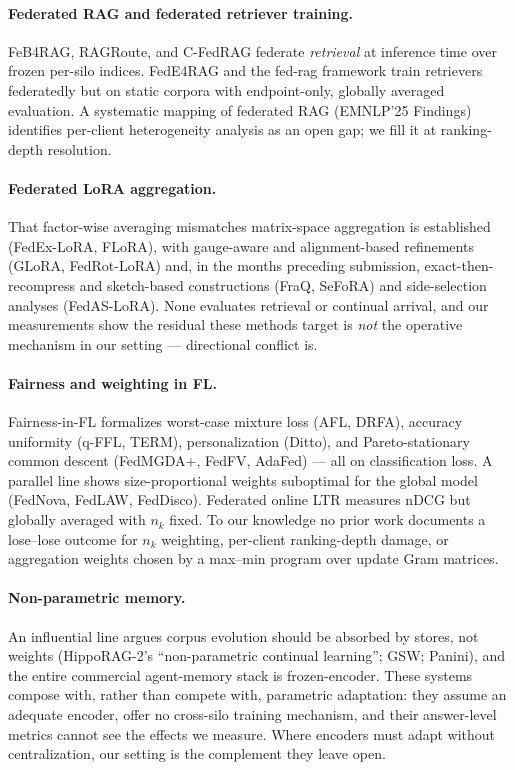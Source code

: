 \documentclass[sigconf,anonymous,review]{acmart}
\begin{document}
\paragraph{Federated RAG and federated retriever training.} FeB4RAG, RAGRoute, and C-FedRAG federate \emph{retrieval} at inference time over frozen per-silo indices. FedE4RAG and the fed-rag framework train retrievers federatedly but on static corpora with endpoint-only, globally averaged evaluation. A systematic mapping of federated RAG (EMNLP'25 Findings) identifies per-client heterogeneity analysis as an open gap; we fill it at ranking-depth resolution.
\paragraph{Federated LoRA aggregation.} That factor-wise averaging mismatches matrix-space aggregation is established (FedEx-LoRA, FLoRA), with gauge-aware and alignment-based refinements (GLoRA, FedRot-LoRA) and, in the months preceding submission, exact-then-recompress and sketch-based constructions (FraQ, SeFoRA) and side-selection analyses (FedAS-LoRA). None evaluates retrieval or continual arrival, and our measurements show the residual these methods target is \emph{not} the operative mechanism in our setting --- directional conflict is.
\paragraph{Fairness and weighting in FL.} Fairness-in-FL formalizes worst-case mixture loss (AFL, DRFA), accuracy uniformity (q-FFL, TERM), personalization (Ditto), and Pareto-stationary common descent (FedMGDA+, FedFV, AdaFed) --- all on classification loss. A parallel line shows size-proportional weights suboptimal for the global model (FedNova, FedLAW, FedDisco). Federated online LTR measures nDCG but globally averaged with $n_k$ fixed. To our knowledge no prior work documents a lose--lose outcome for $n_k$ weighting, per-client ranking-depth damage, or aggregation weights chosen by a max--min program over update Gram matrices.
\paragraph{Non-parametric memory.} An influential line argues corpus evolution should be absorbed by stores, not weights (HippoRAG-2's ``non-parametric continual learning''; GSW; Panini), and the entire commercial agent-memory stack is frozen-encoder. These systems compose with, rather than compete with, parametric adaptation: they assume an adequate encoder, offer no cross-silo training mechanism, and their answer-level metrics cannot see the effects we measure. Where encoders must adapt without centralization, our setting is the complement they leave open.
\end{document}
